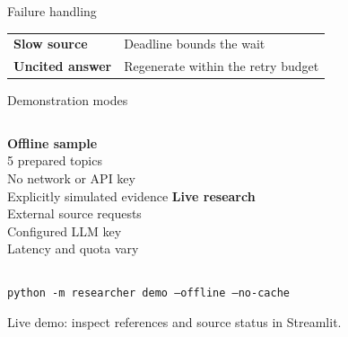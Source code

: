 \documentclass[aspectratio=169,11pt]{beamer}
\begin{document}
\begin{frame}{Failure handling}
\centering
{}
\vspace{0.65cm}\par
\begin{tabular}{ll}
\textbf{Slow source} & Deadline bounds the wait\\[0.2cm]
\textbf{Uncited answer} & Regenerate within the retry budget
\end{tabular}
\end{frame}

\begin{frame}{Demonstration modes}
\begin{columns}[T,onlytextwidth]
{\Large\bfseries\color{accent}Offline sample}\\[0.4cm]
5 prepared topics\\[0.2cm]
No network or API key\\[0.2cm]
Explicitly simulated evidence
{\Large\bfseries\color{accent}Live research}\\[0.4cm]
External source requests\\[0.2cm]
Configured LLM key\\[0.2cm]
Latency and quota vary
\end{columns}
\vspace{0.8cm}
\centering\texttt{python -m researcher demo --offline --no-cache}
\par\vspace{0.3cm}\small Live demo: inspect references and source status in Streamlit.
\end{frame}
\end{document}
